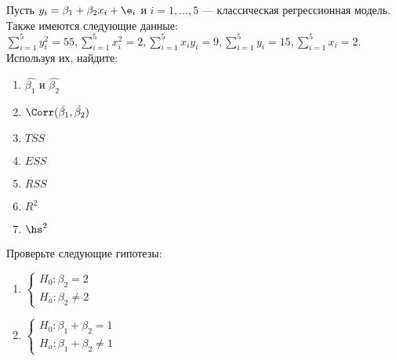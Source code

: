 \documentclass[pdftex,11pt,openany]{book}\usepackage[]{graphicx}\usepackage[]{color}
\begin{document}
\begin{problem}
 Пусть $y_i = \beta_1 + \beta_2 x_i + \e_i$ и $i = 1, \dots, 5$ --- классическая регрессионная модель. Также имеются следующие данные: $\sum_{i=1}^5 y_i^2 = 55, \sum_{i=1}^5 x_i^2 = 2, \sum_{i=1}^5 x_iy_i = 9, \sum_{i=1}^5 y_i = 15, \sum_{i=1}^5 x_i = 2.$ Используя их, найдите:

\begin{enumerate}
\item $\hat{\beta_1}$ и $\hat{\beta_2}$
\item $\Corr(\hat{\beta_1}, \hat{\beta_2})$
\item $TSS$
\item $ESS$
\item $RSS$
\item $R^2$
\item $\hs^2$
\end{enumerate}

Проверьте следующие гипотезы:
\begin{enumerate}
\item $\begin{cases}  H_0: \beta_2 = 2  \\ H_a: \beta_2 \not= 2 \end{cases}$
\item $\begin{cases}  H_0: \beta_1 + \beta_2 = 1  \\ H_a: \beta_1 + \beta_2 \not= 1 \end{cases}$
\end{enumerate}
\end{problem}

\begin{solution}
\end{solution}
\end{document}
